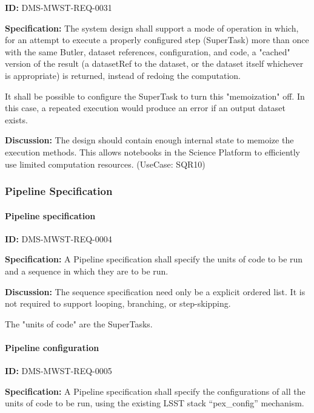 \documentclass[SE,toc,lsstdraft]{lsstdoc}
\begin{document}
\label{DMS-MWST-REQ-0031}
\textbf{ID:} DMS-MWST-REQ-0031

\textbf{Specification:}
The system design shall support a mode of operation in which, for an attempt to execute a properly configured step (SuperTask) more than once with the same Butler, dataset references, configuration, and code, a "cached" version of the result (a datasetRef to the dataset, or the dataset itself whichever is appropriate) is returned, instead of redoing the computation.

It shall be possible to configure the SuperTask to turn this "memoization" off. In this case, a repeated execution would produce an error if an output dataset exists.

\textbf{Discussion:}
The design should contain enough internal state to memoize the execution methods. This allows notebooks in the Science Platform to efficiently use limited computation resources. (UseCase: SQR10)

\subsubsection{Pipeline Specification}

\paragraph{Pipeline specification}\hfill  %

\label{DMS-MWST-REQ-0004}
\textbf{ID:} DMS-MWST-REQ-0004

\textbf{Specification:}
A Pipeline specification shall specify the units of code to be run and a sequence in which they are to be run.

\textbf{Discussion:}
The sequence specification need only be a explicit ordered list.  It is not required to support looping, branching, or step-skipping.

The "units of code" are the SuperTasks.

\paragraph{Pipeline configuration}\hfill  %

\label{DMS-MWST-REQ-0005}
\textbf{ID:} DMS-MWST-REQ-0005

\textbf{Specification:}
A Pipeline specification shall specify the configurations of all the units of code to be run, using the existing LSST stack “pex\_config” mechanism.
\end{document}
